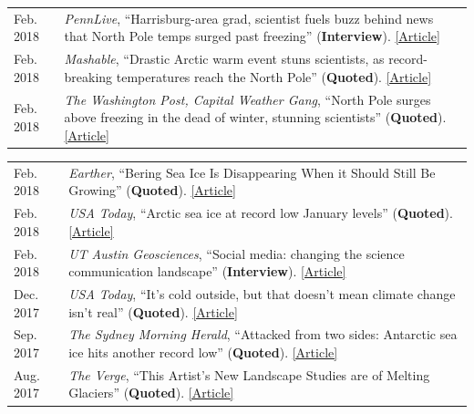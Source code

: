 \documentclass[margin,line,palatino,courier,10pt]{res}
\begin{document}
\begin{resume}
\begin{tabular}{@{}p{0.9in}p{4in}}
Feb. 2018 & \textit{PennLive}, ``Harrisburg-area grad, scientist fuels buzz behind news that North Pole temps surged past freezing'' (\textbf{Interview}). \href{http://www.pennlive.com/news/2018/02/harrisburg-area_scientist_is_b.html}{[Article]}\\
Feb. 2018 & \textit{Mashable}, ``Drastic Arctic warm event stuns scientists, as record-breaking temperatures reach the North Pole'' (\textbf{Quoted}). \href{https://mashable.com/2018/02/26/arctic-heat-wave-north-pole-february-sea-ice/?utm_cid=hp-h-2#jZ.Ip1wPjkqD}{[Article]}\\
Feb. 2018 & \textit{The Washington Post, Capital Weather Gang}, ``North Pole surges above freezing in the dead of winter, stunning scientists'' (\textbf{Quoted}). \href{https://www.washingtonpost.com/news/capital-weather-gang/wp/2018/02/26/north-pole-surges-above-freezing-in-the-dead-of-winter-stunning-scientists/?utm_term=.6025384d6bf1}{[Article]}\\
\end{tabular}
\begin{tabular}{@{}p{0.9in}p{4in}}
Feb. 2018 & \textit{Earther}, ``Bering Sea Ice Is Disappearing When it Should Still Be Growing'' (\textbf{Quoted}). \href{https://earther.com/bering-sea-ice-is-disappearing-at-a-time-when-it-should-1823193914}{[Article]}\\
Feb. 2018 & \textit{USA Today}, ``Arctic sea ice at record low January levels'' (\textbf{Quoted}). \href{https://www.usatoday.com/story/weather/2018/02/20/arctic-sea-ice-record-low-january-levels/355738002/}{[Article]}\\
Feb. 2018 & \textit{UT Austin Geosciences}, ``Social media: changing the science communication landscape'' (\textbf{Interview}). \href{https://www.jsg.utexas.edu/science-yall/social-media-landscape/}{[Article]}\\
Dec. 2017 & \textit{USA Today}, ``It's cold outside, but that doesn't mean climate change isn't real'' (\textbf{Quoted}). \href{https://www.usatoday.com/story/weather/2017/12/28/its-cold-outside-but-doesnt-mean-climate-change-isnt-real/987948001/}{[Article]}\\
Sep. 2017 & \textit{The Sydney Morning Herald}, ``Attacked from two sides: Antarctic sea ice hits another record low'' (\textbf{Quoted}). \href{http://www.smh.com.au/environment/climate-change/attacked-from-two-sides-antarctic-sea-ice-hits-another-record-low-20170926-gyouuc.html}{[Article]}\\
Aug. 2017 & \textit{The Verge}, ``This Artist's New Landscape Studies are of Melting Glaciers'' (\textbf{Quoted}). \href{https://www.theverge.com/2017/8/22/16171276/anthropocene-nasa-justin-brice-guariglia-photography-climate-change}{[Article]}\\

\end{tabular}
\end{resume}
\end{document}
